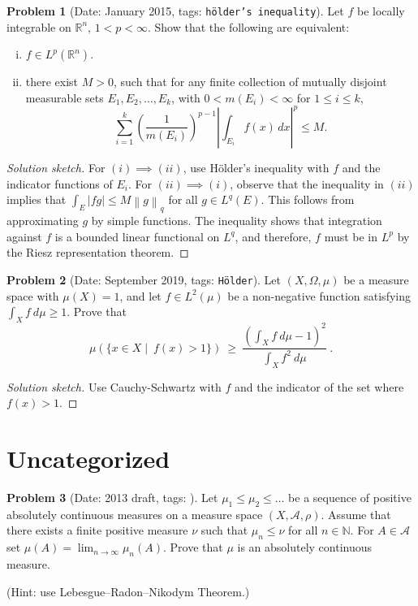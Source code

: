 \documentclass[11pt, notitlepage]{article}
\theoremstyle{definition}
\theoremstyle{definition}
\theoremstyle{definition}
\newtheorem{probstate}{Problem}
\theoremstyle{remark}
\newenvironment{problem}[2]{
    \begin{probstate}[Date: #1, tags: \texttt{#2}]
}
{
  \end{probstate}
}
\newenvironment{sketch}{
    \begin{proof}[Solution sketch]
}
{
    \end{proof}
}
\newcommand{\N}{\mathbb{N}}
\newcommand{\norm}[1]{{\left\|#1\right\|}}
\begin{document}
\begin{problem}{January 2015}{h\"older's inequality}
Let $f$ be locally integrable on $\mathbb R^n$, $1<p<\infty$. Show that the following are equivalent:

\begin{enumerate}[(i)]
    \item $f\in L^p(\mathbb R^n)$.
    \item there exist $M>0$, such that for any finite collection of mutually disjoint measurable sets $E_1, E_2,\dots, E_k$, with $0<m(E_i) <\infty$ for $1\le i\le k$,
$$\sum_{i=1}^k \left(\frac1{m(E_i)}\right)^{p-1}\left|\int_{E_i} f(x)\,dx\right|^p\le M.$$
\end{enumerate}
\end{problem}

\begin{sketch}
  For $(i) \implies (ii)$, use H\"older's inequality with $f$ and the indicator functions of $E_i$. For $(ii) \implies (i)$, observe that the inequality in $(ii)$ implies that $\int_E |fg| \leq M \norm{g}_q$ for all $g \in L^q(E)$. This follows from approximating $g$ by simple functions.
  The inequality shows that integration against $f$ is a bounded linear functional on $L^q$, and therefore, $f$ must be in $L^p$ by the Riesz representation theorem.
\end{sketch}


\begin{problem}{September 2019}{Hölder}
  Let $(X,\Omega,\mu)$ be a measure space with $\mu(X)=1$, and let $f\in L^2(\mu)$ be a non-negative function satisfying $\int_X f \ d\mu\ge 1$. Prove that
$$
\mu\left(\{x\in X  \mid \ f(x)>1\}\right) \ \ge \  \frac{\left(\int_{X} f \ d\mu-1\right)^2}{\int_X f^2 \ d\mu} \ .
$$
\end{problem}

\begin{sketch}
Use Cauchy-Schwartz with $f$ and the indicator of the set where $f(x) > 1$.
\end{sketch}

\section{Uncategorized}

\begin{problem}{2013 draft}{}
Let $\mu_1 \le \mu_2 \le \ldots$ be a sequence of
    positive absolutely continuous measures on a measure space $(X,
    \mathcal{A},\rho)$. Assume that there exists a finite positive measure
    $\nu$ such that $\mu_n \le \nu$ for all $n\in \N$. For $A \in
    \mathcal{A}$ set $\mu(A) = \lim_{n \to \infty} \mu_n(A)$. Prove
    that $\mu$ is an absolutely continuous measure.

    (Hint: use Lebesgue--Radon--Nikodym Theorem.)
\end{problem}
\end{document}
